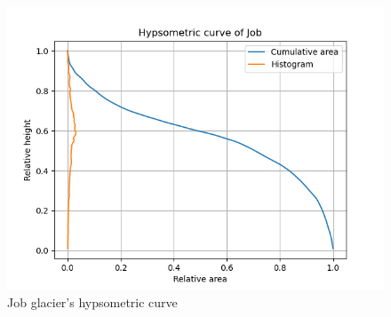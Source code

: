 \documentclass[a4, 12pt]{article}
\begin{document}
\begin{figure}[h!]
	\centering
	\includegraphics[scale=0.5]{../hypsometric_curves/Job_hypso.png}
	\caption{Job glacier's hypsometric curve}
	\label{fig:job_hypso}
\end{figure}
\end{document}
